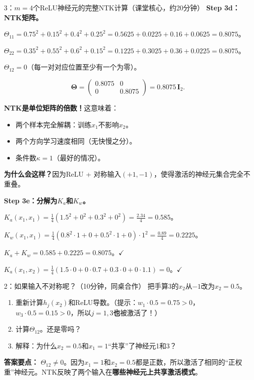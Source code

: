 \documentclass[11pt,a4paper]{article}
\newcommand{\bTheta}{\boldsymbol{\Theta}}
\newcommand{\bI}{\mathbf{I}}
\begin{document}
\begin{handcalc}{3：$m=4$个ReLU神经元的完整NTK计算（课堂核心，约20分钟）}
\bigskip
\textbf{Step 3d：NTK矩阵。}

$\Theta_{11} = 0.75^2+0.15^2+0.4^2+0.25^2 = 0.5625+0.0225+0.16+0.0625 = 0.8075$。

$\Theta_{22} = 0.35^2+0.55^2+0.6^2+0.15^2 = 0.1225+0.3025+0.36+0.0225 = 0.8075$。

$\Theta_{12} = 0$（每一对对应位置至少有一个为零）。

\[
\bTheta = \begin{pmatrix} 0.8075 & 0 \\ 0 & 0.8075 \end{pmatrix} = 0.8075\,\bI_2.
\]

\textbf{NTK是单位矩阵的倍数！}这意味着：
\begin{itemize}[leftmargin=*]
\item 两个样本完全解耦：训练$x_1$不影响$x_2$。
\item 两个方向学习速度相同（无快慢之分）。
\item 条件数$\kappa = 1$（最好的情况）。
\end{itemize}

\textbf{为什么会这样？}因为ReLU + 对称输入$(+1,-1)$，使得激活的神经元集合完全不重叠。

\bigskip
\textbf{Step 3e：分解为$K_a$和$K_w$。}

$K_a(x_1,x_1) = \frac{1}{4}(1.5^2+0^2+0.3^2+0^2) = \frac{2.34}{4} = 0.585$。

$K_w(x_1,x_1) = \frac{1}{4}(0.8^2\cdot 1+0+0.5^2\cdot 1+0)\cdot 1^2 = \frac{0.89}{4} = 0.2225$。

$K_a + K_w = 0.585 + 0.2225 = 0.8075$。$\checkmark$

$K_a(x_1,x_2) = \frac{1}{4}(1.5\cdot 0 + 0\cdot 0.7 + 0.3\cdot 0 + 0\cdot 1.1) = 0$。$\checkmark$
\end{handcalc}

\begin{classexercise}{2：如果输入不对称呢？（10分钟，同桌合作）}
把手算3的$x_2$从$-1$改为$x_2=0.5$。
\begin{enumerate}[label=(\alph*)]
\item 重新计算$h_j(x_2)$和ReLU导数。（提示：$w_1\cdot 0.5=0.75>0$，$w_3\cdot 0.5=0.15>0$，所以$j=1,3$\textbf{也}被激活了！）
\item 计算$\Theta_{12}$。还是零吗？
\item 解释：为什么$x_2=0.5$和$x_1=1$``共享''了神经元1和3？
\end{enumerate}

\textbf{答案要点：} $\Theta_{12}\neq 0$。因为$x_1=1$和$x_2=0.5$都是正数，所以激活了相同的``正权重''神经元。NTK反映了两个输入在\textbf{哪些神经元上共享激活模式}。
\end{classexercise}
\end{document}
